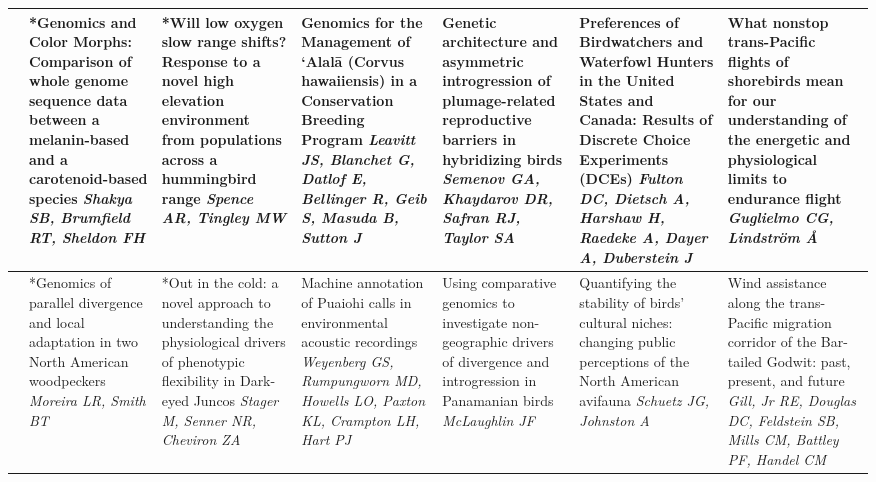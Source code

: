 \begin{tabular}{|x{0.75cm}|x{2.25cm}|x{2.25cm}|a{2.25cm}|a{2.25cm}|a{2.25cm}|a{2.25cm}|}
&*Genomics and Color Morphs: Comparison of whole genome sequence data between a melanin-based and a carotenoid-based species \newline \newline \textit{Shakya SB, Brumfield RT, Sheldon FH} & *Will low oxygen slow range shifts? Response to a novel high elevation environment from populations across a hummingbird range \newline \newline \textit{Spence AR, Tingley MW} & Genomics for the Management of ‘Alalā (Corvus hawaiiensis) in a Conservation Breeding Program \newline \newline \textit{Leavitt JS, Blanchet G, Datlof E, Bellinger R, Geib S, Masuda B, Sutton J} & Genetic architecture and asymmetric introgression of plumage-related reproductive barriers in hybridizing birds \newline \newline \textit{Semenov GA, Khaydarov DR, Safran RJ, Taylor SA} & Preferences of Birdwatchers and Waterfowl Hunters in the United States and Canada: Results of Discrete Choice Experiments (DCEs) \newline \newline \textit{Fulton DC, Dietsch A, Harshaw H, Raedeke A, Dayer A, Duberstein J} & What nonstop trans-Pacific flights of shorebirds mean for our understanding of the energetic and physiological limits to endurance flight \newline \newline \textit{Guglielmo CG, Lindström Å}\\
\hline
{}&*Genomics of parallel divergence and local adaptation in two North American woodpeckers \newline \newline \textit{Moreira LR, Smith BT} & *Out in the cold: a novel approach to understanding the physiological drivers of phenotypic flexibility in Dark-eyed Juncos \newline \newline \textit{Stager M, Senner NR, Cheviron ZA} & Machine annotation of Puaiohi calls in environmental acoustic recordings \newline \newline \textit{Weyenberg GS, Rumpungworn MD, Howells LO, Paxton KL, Crampton LH, Hart PJ} & Using comparative genomics to investigate non-geographic drivers of divergence and introgression in Panamanian birds \newline \newline \textit{McLaughlin JF} & Quantifying the stability of birds’ cultural niches: changing public perceptions of the North American avifauna \newline \newline \textit{Schuetz JG, Johnston A} & Wind assistance along the trans-Pacific migration corridor of the Bar-tailed Godwit: past, present, and future \newline \newline \textit{Gill, Jr RE, Douglas DC, Feldstein SB, Mills CM, Battley PF, Handel CM}\\

\end{tabular}
